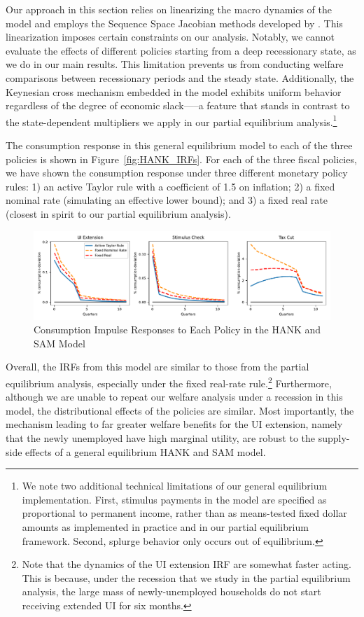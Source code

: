 \documentclass[\econtexRoot/HAFiscal]{subfiles}
\begin{document}
Our approach in this section relies on linearizing the macro dynamics of the model and employs the Sequence Space Jacobian methods developed by \cite{Auclert2021}. This linearization imposes certain constraints on our analysis. Notably, we cannot evaluate the effects of different policies starting from a deep recessionary state, as we do in our main results. This limitation prevents us from conducting welfare comparisons between recessionary periods and the steady state. Additionally, the Keynesian cross mechanism embedded in the model exhibits uniform behavior regardless of the degree of economic slack—--a feature that stands in contrast to the state-dependent multipliers we apply in our partial equilibrium analysis.\footnote{We note two additional technical limitations of our general equilibrium implementation. First, stimulus payments in the model are specified as proportional to permanent income, rather than as means-tested fixed dollar amounts as implemented in practice and in our partial equilibrium framework. Second, splurge behavior only occurs out of equilibrium.} 



The consumption response in this general equilibrium model to each of the three policies is shown in Figure~\ref{fig:HANK_IRFs}. For each of the three fiscal policies, we have shown the consumption response under three different monetary policy rules: 1) an active Taylor rule with a coefficient of 1.5 on inflation; 2) a fixed nominal rate (simulating an effective lower bound); and 3) a fixed real rate (closest in spirit to our partial equilibrium analysis).


\begin{figure}[th]
	\begin{center}
		\includegraphics[width=.9\textwidth]{../Figures/HANK_IRFs_w_splurge.pdf}
		\caption{Consumption Impulse Responses to Each Policy in the HANK and SAM Model}
		\notinsubfile{\label{fig:HANK_IRFs}}
	\end{center}
\end{figure}


Overall, the IRFs from this model are similar to those from the partial equilibrium analysis, especially under the fixed real-rate rule.\footnote{Note that the dynamics of the UI extension IRF are somewhat faster acting. This is because, under the recession that we study in the partial equilibrium analysis, the large mass of newly-unemployed households do not start receiving extended UI for six months. } Furthermore, although we are unable to repeat our welfare analysis under a recession in this model, the distributional effects of the policies are similar. Most importantly, the mechanism leading to far greater welfare benefits for the UI extension, namely that the newly unemployed have high marginal utility, are robust to the supply-side effects of a general equilibrium HANK and SAM model.
\end{document}
